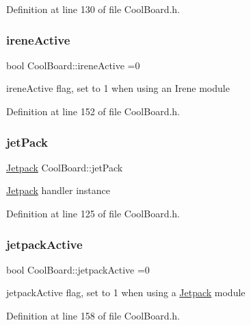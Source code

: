 Definition at line 130 of file Cool\+Board.\+h.

\mbox{\label{class_cool_board_a9c3f7ac625481ee2ae802a25d97a4ae0}} 
\subsubsection{\texorpdfstring{irene\+Active}{ireneActive}}
{\footnotesize\ttfamily bool Cool\+Board\+::irene\+Active =0\hspace{0.3cm}{\ttfamily [private]}}

irene\+Active flag, set to 1 when using an Irene module 

Definition at line 152 of file Cool\+Board.\+h.

\mbox{\label{class_cool_board_a30b1357881b01ccbec676856a91e48e9}} 
\subsubsection{\texorpdfstring{jet\+Pack}{jetPack}}
{\footnotesize\ttfamily \hyperlink{class_jetpack}{Jetpack} Cool\+Board\+::jet\+Pack\hspace{0.3cm}{\ttfamily [private]}}

\hyperlink{class_jetpack}{Jetpack} handler instance 

Definition at line 125 of file Cool\+Board.\+h.

\mbox{\label{class_cool_board_a9be03a913d26e558328935ca3b59a75e}} 
\subsubsection{\texorpdfstring{jetpack\+Active}{jetpackActive}}
{\footnotesize\ttfamily bool Cool\+Board\+::jetpack\+Active =0\hspace{0.3cm}{\ttfamily [private]}}

jetpack\+Active flag, set to 1 when using a \hyperlink{class_jetpack}{Jetpack} module 

Definition at line 158 of file Cool\+Board.\+h.

